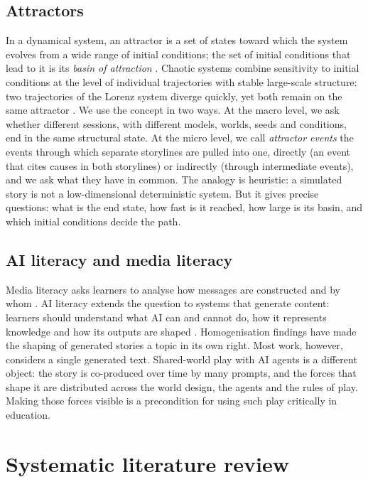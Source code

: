 \documentclass[12pt]{article}
\begin{document}
\subsection{Attractors}

In a dynamical system, an attractor is a set of states toward which the
system evolves from a wide range of initial conditions; the set of initial
conditions that lead to it is its \emph{basin of attraction}
\parencite{strogatz2015}. Chaotic systems combine sensitivity to initial
conditions at the level of individual trajectories with stable large-scale
structure: two trajectories of the Lorenz system diverge quickly, yet both
remain on the same attractor \parencite{lorenz1963}. We use the concept in
two ways. At the macro level, we ask whether different sessions, with
different models, worlds, seeds and conditions, end in the same structural
state. At the micro level, we call \emph{attractor events} the events
through which separate storylines are pulled into one, directly (an event
that cites causes in both storylines) or indirectly (through intermediate
events), and we ask what they have in common. The analogy is heuristic: a
simulated story is not a low-dimensional deterministic system. But it gives
precise questions: what is the end state, how fast is it reached, how large
is its basin, and which initial conditions decide the path.

\subsection{AI literacy and media literacy}

Media literacy asks learners to analyse how messages are constructed and by
whom \parencite{hobbs2010}. AI literacy extends the question to systems that
generate content: learners should understand what AI can and cannot do, how
it represents knowledge and how its outputs are shaped
\parencite{long2020,unesco2024}. Homogenisation findings
\parencite{doshi2024,xu2025} have made the shaping of generated stories a
topic in its own right. Most work, however, considers a single generated
text. Shared-world play with AI agents is a different object: the story is
co-produced over time by many prompts, and the forces that shape it are
distributed across the world design, the agents and the rules of play. Making
those forces visible is a precondition for using such play critically in
education.

\section{Systematic literature review}
\end{document}
